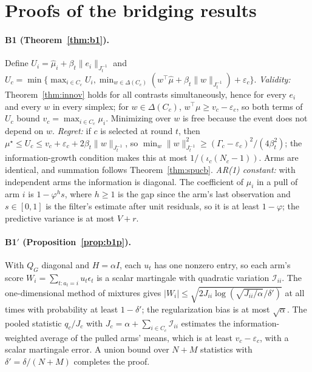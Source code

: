 \documentclass[11pt]{article}
\theoremstyle{definition}
\theoremstyle{remark}
\newcommand{\I}{\mathcal{I}}
\begin{document}
\appendix

\section{Proofs of the bridging results}\label{app:proofs}

\paragraph{B1 (Theorem~\ref{thm:b1}).} Define $U_i=\hat\mu_i+\beta_t\|e_i\|_{J_t^{-1}}$ and $U_c=\min\{\max_{i\in C_c}U_i,\min_{w\in\Delta(C_c)}(w^\top\hat\mu+\beta_t\|w\|_{J_t^{-1}})+\varepsilon_c\}$. \emph{Validity:} Theorem~\ref{thm:innov} holds for all contrasts simultaneously, hence for every $e_i$ and every $w$ in every simplex; for $w\in\Delta(C_c)$, $w^\top\mu\ge v_c-\varepsilon_c$, so both terms of $U_c$ bound $v_c=\max_{i\in C_c}\mu_i$. Minimizing over $w$ is free because the event does not depend on $w$. \emph{Regret:} if $c$ is selected at round $t$, then $\mu^\star\le U_c\le v_c+\varepsilon_c+2\beta_t\|w\|_{J_t^{-1}}$, so $\min_w\|w\|^2_{J_t^{-1}}\ge(\Gamma_c-\varepsilon_c)^2/(4\beta_t^2)$; the information-growth condition makes this at most $1/(\iota_c(N_c-1))$. Arms are identical, and summation follows Theorem~\ref{thm:spucb}. \emph{AR(1) constant:} with independent arms the information is diagonal. The coefficient of $\mu_i$ in a pull of arm $i$ is $1-\varphi^hs$, where $h\ge1$ is the gap since the arm's last observation and $s\in[0,1]$ is the filter's estimate after unit residuals, so it is at least $1-\varphi$; the predictive variance is at most $V+r$.

\paragraph{B1$'$ (Proposition~\ref{prop:b1p}).} With $Q_G$ diagonal and $H=\alpha I$, each $u_t$ has one nonzero entry, so each arm's score $W_i=\sum_{t:a_t=i}u_t\epsilon_t$ is a scalar martingale with quadratic variation $\I_{ii}$. The one-dimensional method of mixtures gives $|W_i|\le\sqrt{2J_{ii}\log(\sqrt{J_{ii}/\alpha}/\delta')}$ at all times with probability at least $1-\delta'$; the regularization bias is at most $\sqrt\alpha$. The pooled statistic $q_c/J_c$ with $J_c=\alpha+\sum_{i\in C_c}\I_{ii}$ estimates the information-weighted average of the pulled arms' means, which is at least $v_c-\varepsilon_c$, with a scalar martingale error. A union bound over $N+M$ statistics with $\delta'=\delta/(N+M)$ completes the proof.
\end{document}
